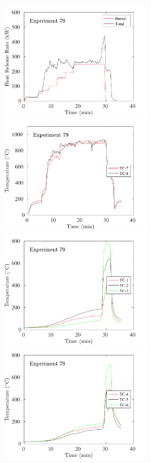 \begin{figure}[H]
\includegraphics[height=2.30in]{../SCRIPT_FIGURES/Test_79_HRR} \hfill
\includegraphics[height=2.30in]{../SCRIPT_FIGURES/Test_79_TC_7-8} \\
\includegraphics[height=2.30in]{../SCRIPT_FIGURES/Test_79_TC_1-3} \hfill
\includegraphics[height=2.30in]{../SCRIPT_FIGURES/Test_79_TC_4-6}

\end{figure}

